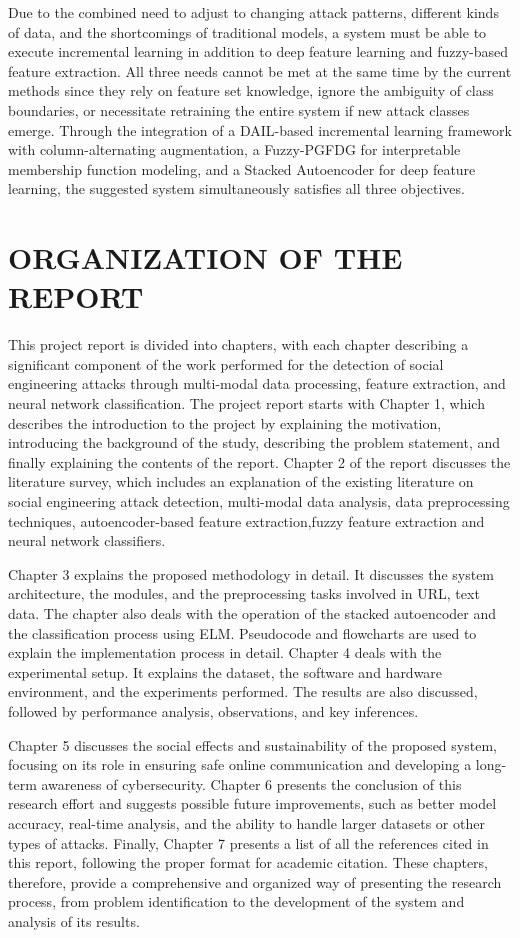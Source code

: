 Due to the combined need to adjust to changing attack patterns, different kinds of data, and the shortcomings of traditional models, a system must be able to execute incremental learning in addition to deep feature learning and fuzzy-based feature extraction. All three needs cannot be met at the same time by the current methods since they rely on feature set knowledge, ignore the ambiguity of class boundaries, or necessitate retraining the entire system if new attack classes emerge. Through the integration of a DAIL-based incremental learning framework with column-alternating augmentation, a Fuzzy-PGFDG for interpretable membership function modeling, and a Stacked Autoencoder for deep feature learning, the suggested system simultaneously satisfies all three objectives.

\section{ORGANIZATION OF THE REPORT}
This project report is divided into chapters, with each chapter describing a significant component of the work performed for the detection of social engineering attacks through multi-modal data processing, feature extraction, and neural network classification. The project report starts with Chapter 1, which describes the introduction to the project by explaining the motivation, introducing the background of the study, describing the problem statement, and finally explaining the contents of the report. Chapter 2 of the report discusses the literature survey, which includes an explanation of the existing literature on social engineering attack detection, multi-modal data analysis, data preprocessing techniques, autoencoder-based feature extraction,fuzzy feature extraction and neural network classifiers.

Chapter 3 explains the proposed methodology in detail. It discusses the system architecture, the modules, and the preprocessing tasks involved in URL, text data. The chapter also deals with the operation of the stacked autoencoder and the classification process using ELM. Pseudocode and flowcharts are used to explain the implementation process in detail. Chapter 4 deals with the experimental setup. It explains the dataset, the software and hardware environment, and the experiments performed. The results are also discussed, followed by performance analysis, observations, and key inferences.

Chapter 5 discusses the social effects and sustainability of the proposed system, focusing on its role in ensuring safe online communication and developing a long-term awareness of cybersecurity. Chapter 6 presents the conclusion of this research effort and suggests possible future improvements, such as better model accuracy, real-time analysis, and the ability to handle larger datasets or other types of attacks. Finally, Chapter 7 presents a list of all the references cited in this report, following the proper format for academic citation. These chapters, therefore, provide a comprehensive and organized way of presenting the research process, from problem identification to the development of the system and analysis of its results.